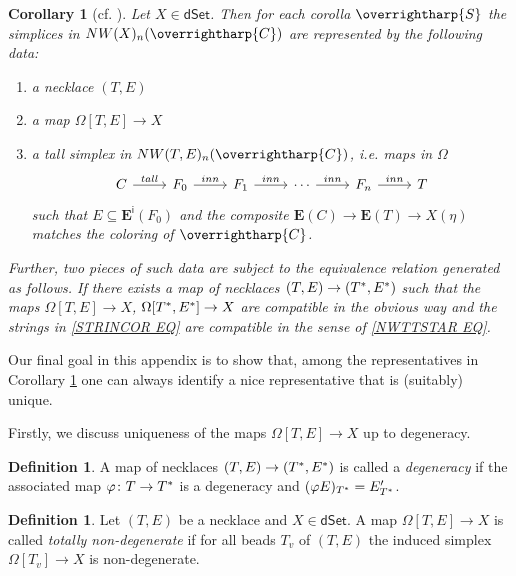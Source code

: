 \documentclass[a4paper,10pt
,draft
]{article}%
\numberwithin{equation}{section}
\numberwithin{figure}{section}
\newtheorem{corollary}[equation]{Corollary}%
\theoremstyle{definition} %
\newtheorem{definition}[equation]{Definition}%
\newcommand{\vect}[1]{\text{\overrightharp{\ensuremath{#1}}}}
\newcommand{\1}{\ensuremath{\mathbbm 1}}%
\begin{document}
\begin{corollary}[{cf. \cite[Cor. 4.8]{DS11}}]
	\label{NWXREPS COR}
	Let $X\in \mathsf{dSet}$.
	Then for each corolla $\vect{S}$ the simplices in 
	$NW(X)_n(\vect{C})$
	are represented by the following data:
\begin{enumerate}[label=(\roman*)]
\item a necklace $(T,E)$ 
\item a map $\Omega[T,E] \to X$
\item a tall simplex in $NW(T,E)_n(\vect{C})$, i.e. maps in $\Omega$
\begin{equation}\label{STRINCOR EQ}
\begin{tikzcd}
	C \ar{r}{tall}
&
	F_0 \ar{r}{inn}
&
	F_1 \ar{r}{inn}
&
	\cdots
	\ar{r}{inn}
&
	F_n \ar{r}{inn}
&
	T
\end{tikzcd}
\end{equation}
such that 
$E \subseteq \boldsymbol{E}^{\mathsf{i}}(F_0)$
and the composite 
$\boldsymbol{E}(C) \to \boldsymbol{E}(T) \to X(\eta)$
matches the coloring of $\vect{C}$.
\end{enumerate}

Further, two pieces of such data are subject to the equivalence relation generated as follows. 
If there exists a map of necklaces $(T,E) \to (T^{\**},E^{\**})$
such that the maps 
$\Omega[T,E] \to X$,
$\Omega[T^{\**},E^{\**}] \to X$
are compatible in the obvious way and the 
strings in \eqref{STRINCOR EQ}
are compatible in the sense of 
\eqref{NWTTSTAR EQ}.
\end{corollary}



Our final goal in this appendix is to show that, 
among the representatives in 
Corollary \ref{NWXREPS COR}
one can always identify a nice representative that is 
(suitably) unique.

Firstly, we discuss uniqueness of 
the maps
$\Omega[T,E] \to X$ up to degeneracy.

\begin{definition}
	A map of necklaces 
	$(T,E) \to (T^{\**},E^{\**})$
	is called a \emph{degeneracy}
	if the associated map
	$\varphi \colon T \to T^{\**}$
	is a degeneracy and
	$(\varphi E)_{T^{\**}} = E'_{T^{\**}}$.
\end{definition}


\begin{definition}
	Let $(T,E)$ be a necklace and $X \in \mathsf{dSet}$.
	A map 
	$\Omega[T,E] \to X$
	is called \emph{totally non-degenerate}
	if for all beads $T_v$ of $(T,E)$
	the induced simplex
	$\Omega[T_v] \to X$
	is non-degenerate.
\end{definition}
\end{document}
